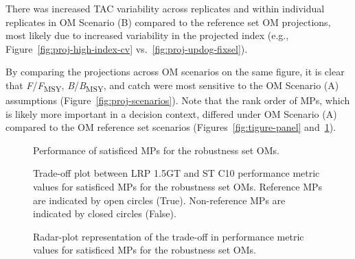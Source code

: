 \documentclass[11pt]{book}
\begin{document}
There was increased TAC variability across replicates and within individual replicates in OM Scenario (B) compared to the reference set OM projections, most likely due to increased variability in the projected index (e.g., Figure~\ref{fig:proj-high-index-cv} vs.~\ref{fig:proj-updog-fixsel}).

By comparing the projections across OM scenarios on the same figure, it is clear that \emph{F}/\emph{F}\textsubscript{MSY}, \emph{B}/\emph{B}\textsubscript{MSY}, and catch were most sensitive to the OM Scenario (A) assumptions (Figure~\ref{fig:proj-scenarios}). Note that the rank order of MPs, which is likely more important in a decision context, differed under OM Scenario (A) compared to the OM reference set scenarios (Figures~\ref{fig:tigure-panel} and~\ref{fig:tigure-panel-rob}).


\begin{figure}[htb]

{\centering {} 

}

\caption{Performance of satisficed MPs for the robustness set OMs.}\label{fig:tigure-panel-rob}
\end{figure}
\begin{figure}[htb]

{\centering {} 

}

\caption{Trade-off plot between LRP 1.5GT and ST C10 performance metric values for satisficed MPs for the robustness set OMs. Reference MPs are indicated by open circles (True). Non-reference MPs are indicated by closed circles (False).}\label{fig:tradeoff-robust}
\end{figure}
\begin{figure}[htb]

{\centering {} 

}

\caption{Radar-plot representation of the trade-off in performance metric values for satisficed MPs for the robustness set OMs.}\label{fig:spider-satisficed-mps-robust}
\end{figure}
\end{document}
